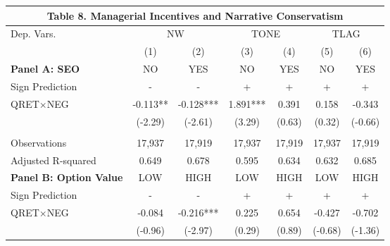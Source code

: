 \begin{table}[H] \label{T8}
  \centering
    \begin{tabular}{lcccccc}
    \multicolumn{7}{c}{\textbf{Table 8. Managerial Incentives and Narrative Conservatism}} \\
    \midrule
    \midrule
    Dep. Vars.& \multicolumn{2}{c}{NW} & \multicolumn{2}{c}{TONE} & \multicolumn{2}{c}{TLAG}\\
      & (1) & (2) & (3) & (4) & (5) & (6) \\
    \midrule
    \multicolumn{1}{l}{\textbf{Panel A: SEO}} & NO & YES & NO & YES & NO & YES \\
    \cmidrule{2-7}
     Sign Prediction & - & - & + & + & + & + \\
     QRET$\times$NEG & -0.113** & -0.128*** & 1.891*** & 0.391 & 0.158 & -0.343 \\
     & (-2.29) & (-2.61) & (3.29) & (0.63) & (0.32) & (-0.66) \\
	&  &  &  &  &  &  \\
    Observations & 17,937 & 17,919 & 17,937 & 17,919 & 17,937 & 17,919 \\
    Adjusted R-squared & 0.649 & 0.678 & 0.595 & 0.634 & 0.632 & 0.685 \\
    \midrule
    \multicolumn{1}{l}{\textbf{Panel B: Option Value}} & LOW & HIGH & LOW & HIGH & LOW & HIGH \\
    \cmidrule{2-7}
     Sign Prediction & - & - & + & + & + & + \\
     \multicolumn{1}{l}{QRET$\times$NEG} & -0.084 & -0.216*** & 0.225 & 0.654 & -0.427 & -0.702 \\
      & (-0.96) & (-2.97) & (0.29) & (0.89) & (-0.68) & (-1.36) \\

\end{tabular}
\end{table}
